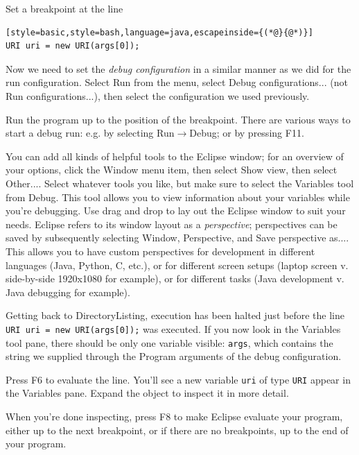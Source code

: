 \documentclass[12pt, a4paper, twoside, openany, titlepage]{book}
\begin{document}
Set a breakpoint at the line
\begin{lstlisting}[style=basic,style=bash,language=java,escapeinside={(*@}{@*)}]
URI uri = new URI(args[0]);
\end{lstlisting}

Now we need to set the \textit{debug configuration} in a similar manner as we did for the run configuration. Select \textsf{Run} from the menu, select \textsf{Debug configurations...} (not \textsf{Run configurations...}), then select the configuration we used previously.

Run the program up to the position of the breakpoint. There are various ways to start a debug run: e.g. by selecting \textsf{Run}$\rightarrow$\textsf{Debug}; or by pressing \textsf{F11}.

You can add all kinds of helpful tools to the Eclipse window; for an overview of your options, click the \textsf{Window} menu item, then select \textsf{Show view}, then select \textsf{Other...}. Select whatever tools you like, but make sure to select the \textsf{Variables} tool from \textsf{Debug}. This tool allows you to view information about your variables while you're debugging. Use drag and drop to lay out the Eclipse window to suit your needs. Eclipse refers to its window layout as a \textit{perspective}; perspectives can be saved by subsequently selecting \textsf{Window}, \textsf{Perspective}, and \textsf{Save perspective as...}. This allows you to have custom perspectives for development in different languages (Java, Python, C, etc.), or for different screen setups (laptop screen v. side-by-side 1920x1080 for example), or for different tasks (Java development v. Java debugging for example).

Getting back to \textsf{DirectoryListing}, execution has been halted just before the line \texttt{URI uri = new URI(args[0]);} was executed. If you now look in the \textsf{Variables} tool pane, there should be only one variable visible: \texttt{args}, which contains the string we supplied through the \textsf{Program arguments} of the debug configuration.

Press \textsf{F6} to evaluate the line. You'll see a new variable \texttt{uri} of type \texttt{URI} appear in the \textsf{Variables} pane. Expand the object to inspect it in more detail.

When you're done inspecting, press \textsf{F8} to make Eclipse evaluate your program, either up to the next breakpoint, or if there are no breakpoints, up to the end of your program.
\end{document}
